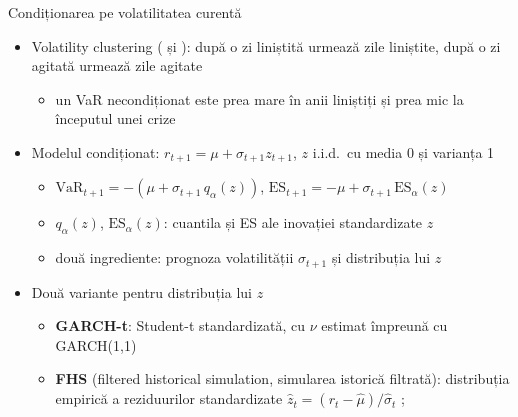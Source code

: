 \begin{frame}{Condiționarea pe volatilitatea curentă}
\itemsize{\footnotesize}
\begin{itemize}
    \item Volatility clustering ( și ): după o zi liniștită urmează zile liniștite, după o zi agitată urmează zile agitate
    \begin{itemize}
        \item un VaR necondiționat este prea mare în anii liniștiți și prea mic la începutul unei crize
    \end{itemize}
    \item Modelul condiționat: $r_{t+1} = \mu + \sigma_{t+1}z_{t+1}$, $z$ i.i.d.\ cu media 0 și varianța 1
    \begin{itemize}
        \item $\mathrm{VaR}_{t+1} = -(\mu + \sigma_{t+1}\,q_\alpha(z))$, \quad $\mathrm{ES}_{t+1} = -\mu + \sigma_{t+1}\,\mathrm{ES}_\alpha(z)$
        \item $q_\alpha(z)$, $\mathrm{ES}_\alpha(z)$: cuantila și ES ale inovației standardizate $z$
        \item două ingrediente: prognoza volatilității $\sigma_{t+1}$ și distribuția lui $z$
    \end{itemize}
    \item Două variante pentru distribuția lui $z$
    \begin{itemize}
        \item \textbf{GARCH-t}: Student-t standardizată, cu $\nu$ estimat împreună cu GARCH(1,1) 
        \item \textbf{FHS} (filtered historical simulation, simularea istorică filtrată): distribuția empirică a reziduurilor standardizate $\hat z_t = (r_t - \hat\mu)/\hat\sigma_t$ ; 
    \end{itemize}
\end{itemize}
\end{frame}

